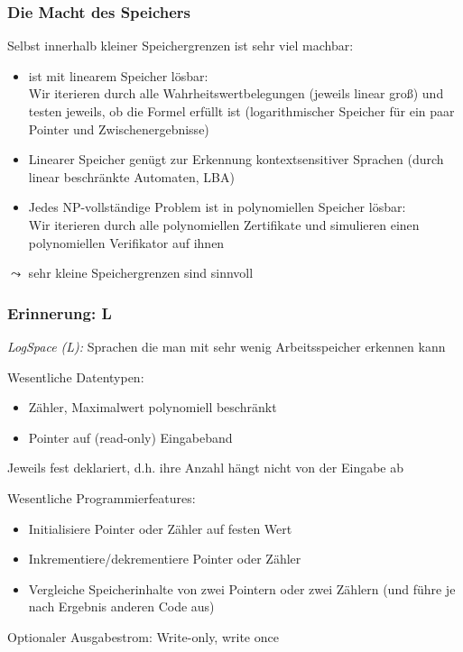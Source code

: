 \documentclass[onlymath]{beamer}
\begin{document}
\begin{frame}\frametitle{Die Macht des Speichers}

Selbst innerhalb kleiner Speichergrenzen ist sehr viel machbar:\pause
\begin{itemize}
\item {} ist mit linearem Speicher lösbar:\\
Wir iterieren durch alle Wahrheitswertbelegungen (jeweils linear groß) und
testen jeweils, ob die Formel erfüllt ist (logarithmischer Speicher für ein paar Pointer und Zwischenergebnisse)\pause
\item Linearer Speicher genügt zur Erkennung kontextsensitiver Sprachen (durch linear beschränkte Automaten, LBA)\pause
\item Jedes NP-vollständige Problem ist in polynomiellen Speicher lösbar:\\
Wir iterieren durch alle polynomiellen Zertifikate und simulieren einen polynomiellen
Verifikator auf ihnen
\end{itemize}

$\leadsto$ sehr kleine Speichergrenzen sind sinnvoll

\end{frame}

\begin{frame}\frametitle{Erinnerung: L}

\emph{LogSpace (L):} Sprachen die man mit sehr wenig Arbeitsspeicher erkennen kann
\bigskip

\alert{Wesentliche Datentypen:} 
\begin{itemize}
\item Zähler, Maximalwert polynomiell beschränkt
\item Pointer auf (read-only) Eingabeband
\end{itemize}
{\tiny Jeweils fest deklariert, d.h. ihre Anzahl hängt nicht von der Eingabe ab

}
\bigskip

\alert{Wesentliche Programmierfeatures:}
\begin{itemize}
\item Initialisiere Pointer oder Zähler auf festen Wert
\item Inkrementiere/dekrementiere Pointer oder Zähler
\item Vergleiche Speicherinhalte von zwei Pointern oder zwei Zählern (und führe je nach Ergebnis anderen Code aus)
\end{itemize}
\bigskip

\alert{Optionaler Ausgabestrom:} Write-only, write once 

\end{frame}
\end{document}
